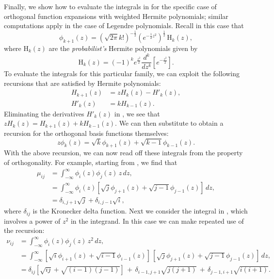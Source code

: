 Finally, we show how to evaluate the integrals in 
for the specific case of orthogonal function expansions with weighted Hermite polynomials;
{similar computations apply in the case of Legendre polynomials.}
Recall in this case that
\begin{equation}
\phi_{k+1}(z) = \left(\sqrt{2\pi}k!\right)^{-\frac{1}{2}}\left(e^{-\frac{1}{2}z^2}\right)^{\frac{1}{2}}\,\text{H}_{k}(z),
\label{eq:phiH-def}
\end{equation}
where $\text{H}_k(z)$ are the \emph{probabilist's} Hermite polynomials given by
\begin{equation}
\text{H}_k(z) = (-1)^k e^{\frac{z^2}{2}} \frac{d^k}{dz^k}\left[e^{-\frac{z^2}{2}}\right].
\end{equation}
To evaluate the integrals for this particular family, we can exploit the following recursions that are satisfied by Hermite polynomials:
\begin{align}
  H_{k+1}(z) &= zH_k(z) - H'_k(z), \label{eq:Hrecur1} \\
  H'_k(z) &= kH_{k-1}(z). \label{eq:Hrecur2}
\end{align}
Eliminating the derivatives $H'_k(z)$ in ,
we see that $zH_k(z) = H_{k+1}(z) + kH_{k-1}(z)$.
We can then substitute  to obtain a recursion
for the orthogonal basis functions themselves:
\begin{equation}
z\phi_k(z) = \sqrt{k}\phi_{k+1}(z) + \sqrt{k\!-\!1}\phi_{k-1}(z).
\label{eq:phi-recur}
\end{equation}
With the above recursion, we can now read off these integrals from the property of orthogonality.
For example, starting from , we find that
\begin{align}
\mu_{ij}
  &= \int_{-\infty}^\infty\! \phi_i(z)\phi_j(z)\, z\, dz, \\
  &= \int_{-\infty}^\infty\! \phi_i(z) \left[\sqrt{j}\phi_{j+1}(z) + \sqrt{j\!-\!1}\phi_{j-1}(z)\right]\, dz, \\
  &= \delta_{i,j+1}\sqrt{j} + \delta_{i,j-1}\sqrt{i}, \label{eq:mom1ij}
\end{align}
where $\delta_{ij}$ is the Kronecker delta function.
Next we consider the integral in ,
which involves a power of $z^2$ in the integrand. In this case we can make repeated use of the recursion:
\begin{align}
\nu_{ij}
  &= \int_{-\infty}^\infty\! \phi_i(z)\phi_j(z)\, z^2\, dz, \\
  &= \int_{-\infty}^\infty\! \left[\sqrt{i}\phi_{i+1}(z) + \sqrt{i\!-\!1}\phi_{i-1}(z)\right]\, \left[\sqrt{j}\phi_{j+1}(z) + \sqrt{j\!-\!1}\phi_{j-1}(z)\right]\, dz, \\
  &= \delta_{ij}\left[\sqrt{ij}+\sqrt{(i\!-\!1)(j\!-\!1)}\right]\,
      +\, \delta_{i-1,j+1}\sqrt{j(j\!+\!1)}\,
      +\, \delta_{j-1,i+1}\sqrt{i(i\!+\!1)}.
      \label{eq:mom2ij}
\end{align}
